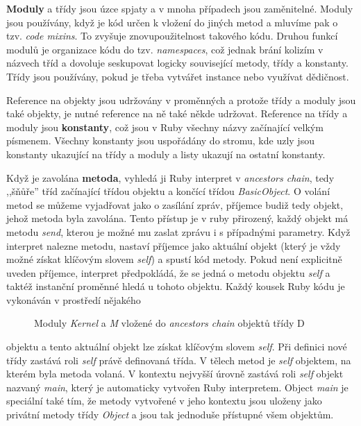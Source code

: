 \documentclass[12pt,a4paper,oneside]{article}
\begin{document}
\textbf{Moduly} a třídy jsou úzce spjaty a v mnoha případech jsou zaměnitelné. Moduly jsou používány, když je kód určen k vložení do jiných metod a mluvíme pak o tzv. \emph{code mixins}. To zvyšuje znovupoužitelnost takového kódu. Druhou funkcí modulů je organizace kódu do tzv. \emph{namespaces}, což jednak brání kolizím v názvech tříd a dovoluje seskupovat logicky související metody, třídy a konstanty. Třídy jsou používány, pokud je třeba vytvářet instance nebo využívat dědičnost.

Reference na objekty jsou udržovány v proměnných a protože třídy a moduly jsou také objekty, je nutné reference na ně také někde udržovat. Reference na třídy a moduly jsou \textbf{konstanty}, což jsou v Ruby všechny názvy začínající velkým písmenem. Všechny konstanty jsou uspořádány do stromu, kde uzly jsou konstanty ukazující na třídy a moduly a listy ukazují na ostatní konstanty.

Když je zavolána \textbf{metoda}, vyhledá ji Ruby interpret v \emph{ancestors chain}, tedy ,,šňůře'' tříd začínající třídou objektu a končící třídou \emph{BasicObject}. O volání metod se můžeme vyjadřovat jako o zasílání zpráv, příjemce budiž tedy objekt, jehož metoda byla zavolána. Tento přístup je v ruby přirozený, každý objekt má metodu \emph{send}, kterou je možné mu zaslat zprávu i s případnými parametry. Když interpret nalezne metodu, nastaví příjemce jako aktuální objekt (který je vždy možné získat klíčovým slovem \emph{self}) a spustí kód metody. Pokud není explicitně uveden příjemce, interpret předpokládá, že se jedná o metodu objektu \emph{self} a taktéž instanční proměnné hledá u tohoto objektu. Každý kousek Ruby kódu je vykonáván v prostředí nějakého
\begin{figure}
\centering
\setlength\fboxsep{0.5pt}
\setlength\fboxrule{0.5pt}
\caption{Moduly \emph{Kernel} a \emph{M} vložené do \emph{ancestors chain} objektů třídy D \cite{metaRuby}}
\label{fig:included_modules}
\end{figure}
objektu a tento aktuální objekt lze získat klíčovým slovem \emph{self}. Při definici nové třídy zastává roli \emph{self} právě definovaná třída. V tělech metod je \emph{self} objektem, na kterém byla metoda volaná. V kontextu nejvyšší úrovně zastává roli \emph{self} objekt nazvaný \emph{main}, který je automaticky vytvořen Ruby interpretem. Object \emph{main} je speciální také tím, že metody vytvořené v jeho kontextu jsou uloženy jako privátní metody třídy \emph{Object} a jsou tak jednoduše přístupné všem objektům.
\end{document}
